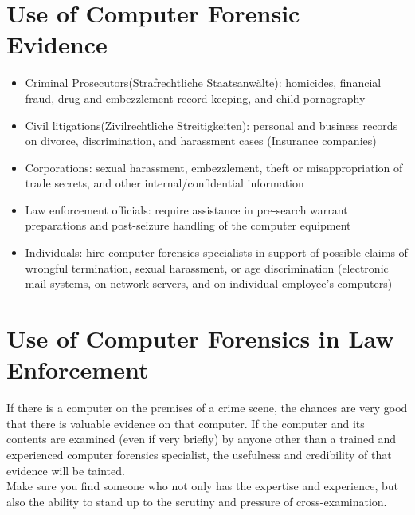 \documentclass{scrreprt}
\begin{document}
\section{Use of Computer Forensic Evidence}
\begin{itemize}
\item Criminal Prosecutors(Strafrechtliche Staatsanwälte): homicides, financial fraud, drug and embezzlement record-keeping, and child pornography
\item Civil litigations(Zivilrechtliche Streitigkeiten): personal and business records on divorce, discrimination, and harassment cases (Insurance companies)
\item Corporations: sexual harassment, embezzlement, theft or misappropriation of trade secrets, and other internal/confidential information
\item Law enforcement officials: require assistance in pre-search warrant
preparations and post-seizure handling of the computer equipment
\item Individuals: hire computer forensics specialists in support of possible claims of wrongful termination, sexual harassment, or age discrimination (electronic mail systems, on network servers, and on individual employee’s computers)
\end{itemize}

\section{Use of Computer Forensics in Law Enforcement}
If there is a computer on the premises of a crime scene, the chances are very good that
there is valuable evidence on that computer. If the computer and its contents are examined (even if very briefly) by anyone other than a trained and experienced computer
forensics specialist, the usefulness and credibility of that evidence will be tainted.
\\Make sure you find someone who not only has the expertise and experience, but also the ability to stand up to the scrutiny and pressure of cross-examination.
\end{document}
